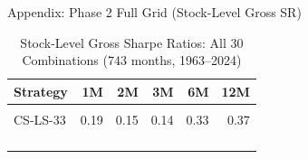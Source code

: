 \documentclass[
  ignorenonframetext,
  aspectratio=169]{beamer}
\begin{document}
\begin{frame}{Appendix: Phase 2 Full Grid (Stock-Level Gross SR)}
\label{appendix-phase-2-full-grid-stock-level-gross-sr}
\begin{table}[!h]
\centering
\caption{\label{tab:appendix-full-grid}Stock-Level Gross Sharpe Ratios: All 30 Combinations (743 months, 1963--2024)}
\centering
\fontsize{9}{11}\selectfont
\begin{tabular}[t]{lrrrrr}
\toprule
Strategy & 1M & 2M & 3M & 6M & 12M\\
\midrule
\cellcolor{gray!10}{CS-LS-50} & \cellcolor{gray!10}{0.22} & \cellcolor{gray!10}{0.15} & \cellcolor{gray!10}{0.11} & \cellcolor{gray!10}{0.33} & \cellcolor{gray!10}{0.39}\\
CS-LS-33 & 0.19 & 0.15 & 0.14 & 0.33 & 0.37\\
\cellcolor{gray!10}{CS-LS-25} & \cellcolor{gray!10}{0.17} & \cellcolor{gray!10}{0.15} & \cellcolor{gray!10}{0.14} & \cellcolor{gray!10}{0.32} & \cellcolor{gray!10}{0.36}\\
\cellcolor[HTML]{e8f0fb}{CS-LO-50} & \cellcolor[HTML]{e8f0fb}{0.68} & \cellcolor[HTML]{e8f0fb}{0.65} & \cellcolor[HTML]{e8f0fb}{0.56} & \cellcolor[HTML]{e8f0fb}{0.76} & \cellcolor[HTML]{e8f0fb}{0.83}\\
\cellcolor[HTML]{e8f0fb}{\cellcolor{gray!10}{CS-LO-33}} & \cellcolor[HTML]{e8f0fb}{\cellcolor{gray!10}{0.51}} & \cellcolor[HTML]{e8f0fb}{\cellcolor{gray!10}{0.50}} & \cellcolor[HTML]{e8f0fb}{\cellcolor{gray!10}{0.46}} & \cellcolor[HTML]{e8f0fb}{\cellcolor{gray!10}{0.63}} & \cellcolor[HTML]{e8f0fb}{\cellcolor{gray!10}{0.71}}\\
\addlinespace
\cellcolor[HTML]{e8f0fb}{CS-LO-25} & \cellcolor[HTML]{e8f0fb}{0.44} & \cellcolor[HTML]{e8f0fb}{0.43} & \cellcolor[HTML]{e8f0fb}{0.40} & \cellcolor[HTML]{e8f0fb}{0.57} & \cellcolor[HTML]{e8f0fb}{0.66}\\
\bottomrule
\end{tabular}
\end{table}
\end{frame}
\end{document}
